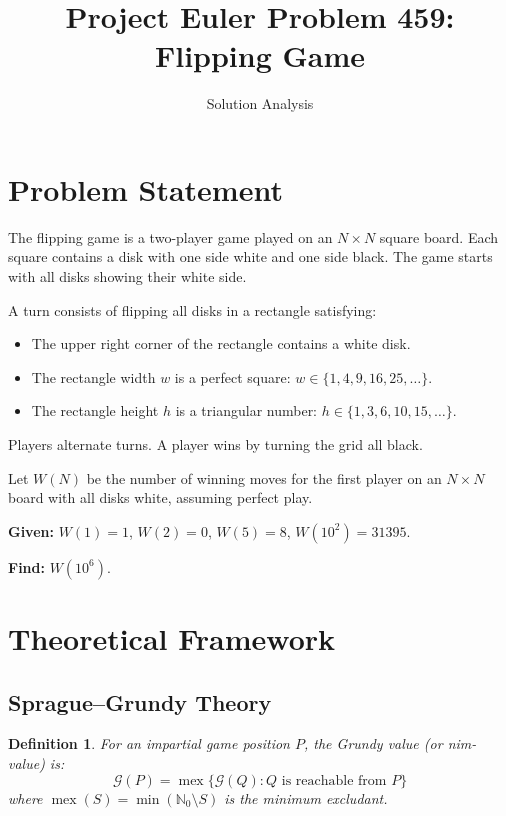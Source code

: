 \documentclass[11pt]{article}
\title{Project Euler Problem 459: Flipping Game}
\author{Solution Analysis}
\date{}
\newtheorem{definition}{Definition}
\begin{document}
\maketitle

\section{Problem Statement}

The flipping game is a two-player game played on an $N \times N$ square board.
Each square contains a disk with one side white and one side black.
The game starts with all disks showing their white side.

A turn consists of flipping all disks in a rectangle satisfying:
\begin{itemize}
    \item The upper right corner of the rectangle contains a white disk.
    \item The rectangle width $w$ is a perfect square: $w \in \{1, 4, 9, 16, 25, \ldots\}$.
    \item The rectangle height $h$ is a triangular number: $h \in \{1, 3, 6, 10, 15, \ldots\}$.
\end{itemize}

Players alternate turns. A player wins by turning the grid all black.

Let $W(N)$ be the number of winning moves for the first player on an $N \times N$
board with all disks white, assuming perfect play.

\textbf{Given:} $W(1) = 1$, $W(2) = 0$, $W(5) = 8$, $W(10^2) = 31395$.

\textbf{Find:} $W(10^6)$.

\section{Theoretical Framework}

\subsection{Sprague--Grundy Theory}

\begin{definition}
For an impartial game position $P$, the \emph{Grundy value} (or nim-value) is:
\[
\mathcal{G}(P) = \operatorname{mex}\{\mathcal{G}(Q) : Q \text{ is reachable from } P\}
\]
where $\operatorname{mex}(S) = \min(\mathbb{N}_0 \setminus S)$ is the minimum excludant.
\end{definition}
\end{document}
